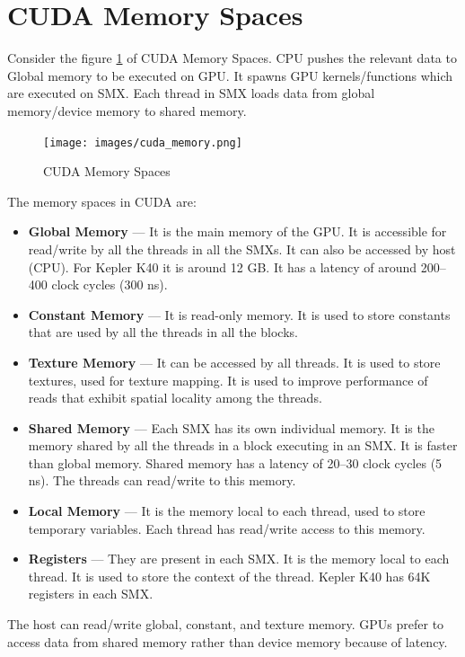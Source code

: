 \documentclass[12pt]{book}
\begin{document}
\section{CUDA Memory Spaces}
Consider the figure \ref{fig:cuda_memory} of CUDA Memory Spaces. CPU pushes the relevant data to Global memory to be executed on GPU.
It spawns GPU kernels/functions which are executed on SMX. Each thread in SMX loads data from global memory/device memory to shared memory.
\begin{figure}[H]
    \centering
    \texttt{[image: images/cuda\_memory.png]}
    \caption{CUDA Memory Spaces}
    \label{fig:cuda_memory}
\end{figure}
The memory spaces in CUDA are:
\begin{itemize}
    \item \textbf{Global Memory} — It is the main memory of the GPU. It is accessible for read/write by all the threads in all the SMXs. 
    It can also be accessed by host (CPU). For Kepler K40 it is around 12 GB. It has a latency of around 200–400 clock cycles (300 ns).
    
    \item \textbf{Constant Memory} — It is read-only memory. It is used to store constants that are used by all the threads in all the blocks.
    
    \item \textbf{Texture Memory} — It can be accessed by all threads. It is used to store textures, used for texture mapping. It is used to improve performance of reads that exhibit spatial locality among the threads.
    
    \item \textbf{Shared Memory} — Each SMX has its own individual memory. It is the memory shared by all the threads in a block executing in an SMX. It is faster than global memory. Shared memory has a latency of 20–30 clock cycles (5 ns). The threads can read/write to this memory.
    
    \item \textbf{Local Memory} — It is the memory local to each thread, used to store temporary variables. Each thread has read/write access to this memory.
    
    \item \textbf{Registers} — They are present in each SMX. It is the memory local to each thread. It is used to store the context of the thread. Kepler K40 has 64K registers in each SMX.
\end{itemize}
The host can read/write global, constant, and texture memory. GPUs prefer to access data from shared memory rather than device memory because of latency.
\end{document}
